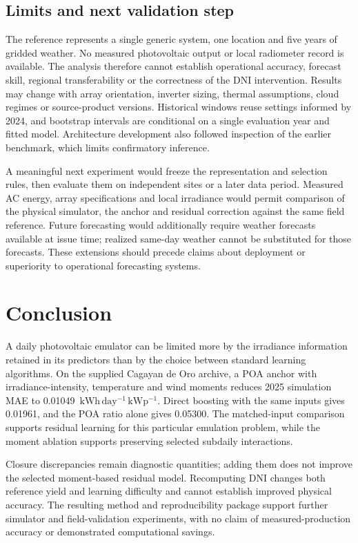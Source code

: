 \documentclass[11pt,a4paper]{article}
\newcommand{\unit}{\ensuremath{\mathrm{kWh\,day^{-1}\,kWp^{-1}}}}
\begin{document}
\subsection{Limits and next validation step}
The reference represents a single generic system, one location and five years of gridded weather. No measured photovoltaic output or local radiometer record is available. The analysis therefore cannot establish operational accuracy, forecast skill, regional transferability or the correctness of the DNI intervention. Results may change with array orientation, inverter sizing, thermal assumptions, cloud regimes or source-product versions. Historical windows reuse settings informed by 2024, and bootstrap intervals are conditional on a single evaluation year and fitted model. Architecture development also followed inspection of the earlier benchmark, which limits confirmatory inference.

A meaningful next experiment would freeze the representation and selection rules, then evaluate them on independent sites or a later data period. Measured AC energy, array specifications and local irradiance would permit comparison of the physical simulator, the anchor and residual correction against the same field reference. Future forecasting would additionally require weather forecasts available at issue time; realized same-day weather cannot be substituted for those forecasts. These extensions should precede claims about deployment or superiority to operational forecasting systems.

\section{Conclusion}
A daily photovoltaic emulator can be limited more by the irradiance information retained in its predictors than by the choice between standard learning algorithms. On the supplied Cagayan de Oro archive, a POA anchor with irradiance-intensity, temperature and wind moments reduces 2025 simulation MAE to 0.01049~\unit{}. Direct boosting with the same inputs gives 0.01961, and the POA ratio alone gives 0.05300. The matched-input comparison supports residual learning for this particular emulation problem, while the moment ablation supports preserving selected subdaily interactions.

Closure discrepancies remain diagnostic quantities; adding them does not improve the selected moment-based residual model. Recomputing DNI changes both reference yield and learning difficulty and cannot establish improved physical accuracy. The resulting method and reproducibility package support further simulator and field-validation experiments, with no claim of measured-production accuracy or demonstrated computational savings.
\end{document}
